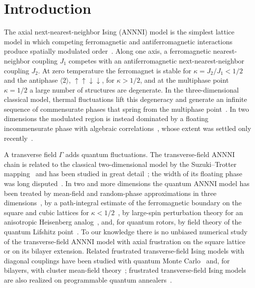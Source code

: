 \documentclass[
 aps,prb,
 twocolumn,
 superscriptaddress,
 longbibliography,
 nofootinbib,
 floatfix
]{revtex4-2}
\newcommand{\up}{\uparrow}
\newcommand{\dn}{\downarrow}
\begin{document}
\maketitle

\section{Introduction}
\label{sec:intro}

The axial next-nearest-neighbor Ising (ANNNI) model is the simplest lattice model in which
competing ferromagnetic and antiferromagnetic interactions produce spatially modulated
order~\cite{elliott1961phenomenological,selke1988annni}. Along one axis, a ferromagnetic
nearest-neighbor coupling $J_1$ competes with an antiferromagnetic next-nearest-neighbor coupling
$J_2$. At zero temperature the ferromagnet is stable for $\kappa=J_2/J_1<1/2$ and the antiphase
$\langle2\rangle$, $\up\up\dn\dn$, for $\kappa>1/2$, and at the multiphase point $\kappa=1/2$ a large
number of structures are degenerate. In the three-dimensional classical model, thermal fluctuations
lift this degeneracy and generate an infinite sequence of commensurate phases that spring from the
multiphase point~\cite{fisher1980infinitely,bak1980commensurate,selke1988annni}. In two dimensions
the modulated region is instead dominated by a floating incommensurate phase with algebraic
correlations~\cite{villain1981two,pokrovsky1979ground}, whose extent was settled only
recently~\cite{shirakura2014,hu2021resolving,keiser2026}.

A transverse field $\Gamma$ adds quantum fluctuations. The transverse-field ANNNI chain is related to
the classical two-dimensional model by the Suzuki--Trotter mapping~\cite{suzuki1976relationship}
and has been studied in great
detail~\cite{rieger1996one,chandra2007floating,beccaria2007floating,suzuki2013quantum}; the width of
its floating phase was long disputed~\cite{chandra2007floating,beccaria2007floating}. In two and
more dimensions the quantum ANNNI model has been treated by mean-field and random-phase approximations
in three dimensions~\cite{sen1989ising}, by a path-integral estimate of the ferromagnetic boundary on the
square and cubic lattices for $\kappa<1/2$~\cite{sen1995order}, by large-spin perturbation theory for an
anisotropic Heisenberg analog~\cite{harris1995quantum,harris1995quantumb}, and, for quantum rotors, by field
theory of the quantum Lifshitz point~\cite{dutta1997quantum}. To our knowledge there is no unbiased numerical study of the
transverse-field ANNNI model with axial frustration on the square lattice or on its bilayer
extension. Related frustrated transverse-field Ising models with diagonal couplings have been
studied with quantum Monte
Carlo~\cite{iglovikov2013,kato2015quantum,biswas2016quantum} and, for bilayers, with cluster
mean-field theory~\cite{kellermann2019quantum,roos2024frustrated,roos2026persistent}; frustrated
transverse-field Ising models are also realized on programmable quantum
annealers~\cite{king2018observation}.
\end{document}
